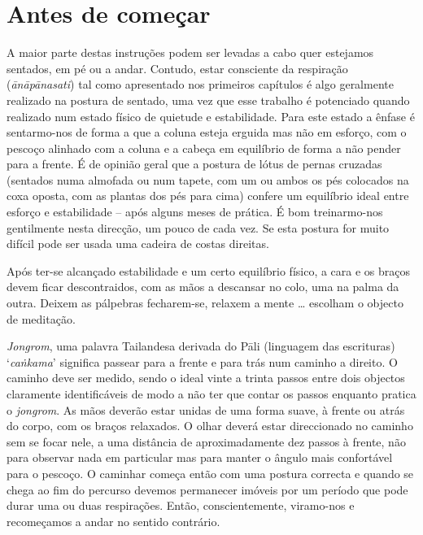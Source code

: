 \chapter{Antes de começar}

A maior parte destas instruções podem ser levadas a cabo quer estejamos
sentados, em pé ou a andar. Contudo, estar consciente da respiração
(\emph{ānāpānasati}) tal como apresentado nos primeiros capítulos é algo
geralmente realizado na postura de sentado, uma vez que esse trabalho é
potenciado quando realizado num estado físico de quietude e
estabilidade. Para este estado a ênfase é sentarmo-nos de forma a que a
coluna esteja erguida mas não em esforço, com o pescoço alinhado com a
coluna e a cabeça em equilíbrio de forma a não pender para a frente. É
de opinião geral que a postura de lótus de pernas cruzadas (sentados
numa almofada ou num tapete, com um ou ambos os pés colocados na coxa
oposta, com as plantas dos pés para cima) confere um equilíbrio ideal
entre esforço e estabilidade -- após alguns meses de prática. É bom
treinarmo-nos gentilmente nesta direcção, um pouco de cada vez. Se esta
postura for muito difícil pode ser usada uma cadeira de costas direitas.

Após ter-se alcançado estabilidade e um certo equilíbrio físico, a cara
e os braços devem ficar descontraidos, com as mãos a descansar no colo,
uma na palma da outra. Deixem as pálpebras fecharem-se, relaxem a mente
\ldots{} escolham o objecto de meditação.

\emph{Jongrom}, uma palavra Tailandesa derivada do Pāli (linguagem das
escrituras) `\emph{caṅkama}' significa passear para a frente e para trás
num caminho a direito. O caminho deve ser medido, sendo o ideal vinte a
trinta passos entre dois objectos claramente
identificáveis de modo a não ter que contar os passos enquanto
pratica o \emph{jongrom}. As mãos deverão estar unidas de uma forma
suave, à frente ou atrás do corpo, com os braços relaxados. O olhar
deverá estar direccionado no caminho sem se focar nele, a uma distância
de aproximadamente dez passos à frente, não para observar nada em
particular mas para manter o ângulo mais confortável para o pescoço. O
caminhar começa então com uma postura correcta e quando se chega ao fim
do percurso devemos permanecer imóveis por um período que pode durar uma
ou duas respirações. Então, conscientemente, viramo-nos e recomeçamos a
andar no sentido contrário.

